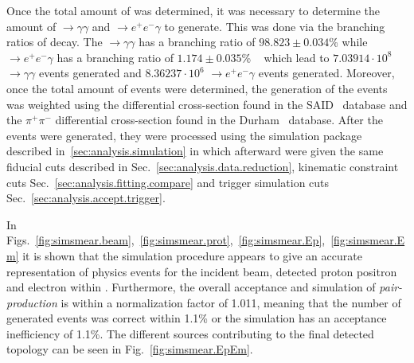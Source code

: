 	Once the total amount of \pizT was determined, it was necessary to determine the amount of \pizT$\to \gamma \gamma$ and \pizT $\to e^+e^- \gamma$ to generate. This was done via the branching ratios of \pizT decay. The \pizT $\to \gamma \gamma$ has a branching ratio of $98.823 \pm 0.034$\% while \pizT$\to e^+e^- \gamma$ has a branching ratio of $1.174 \pm 0.035$\% ~\cite{pdg2014} which lead to $7.03914 \cdot10^8$ \pizT $\to \gamma \gamma$ events generated and $8.36237 \cdot10^6$ \pizT$\to e^+e^- \gamma$ events generated. Moreover, once the total amount of events were determined, the generation of the events was weighted using the \pizT differential cross-section found in the SAID~\cite{SAID} database and the $\pi^+\pi^-$ differential cross-section found in the Durham~\cite{durham} database. After the events were generated, they were processed using the simulation package described in~\ref{sec:analysis.simulation} in which afterward were given the same fiducial cuts described in Sec.~\ref{sec:analysis.data.reduction}, kinematic constraint cuts Sec.~\ref{sec:analysis.fitting.compare} and trigger simulation cuts Sec.~\ref{sec:analysis.accept.trigger}. 
	
	In Figs.~\ref{fig:simsmear.beam},~\ref{fig:simsmear.prot},~\ref{fig:simsmear.Ep},~\ref{fig:simsmear.Em} it is shown that the simulation procedure appears to give an accurate representation of physics events for the incident beam, detected proton positron and electron within . Furthermore, the overall acceptance and simulation of \emph{pair-production} is within a normalization factor of 1.011, meaning that the number of generated events was correct within 1.1\% or the simulation has an acceptance inefficiency of 1.1\%. The different sources contributing to the final detected \epemT topology can be seen in Fig.~\ref{fig:simsmear.EpEm}. 
	
